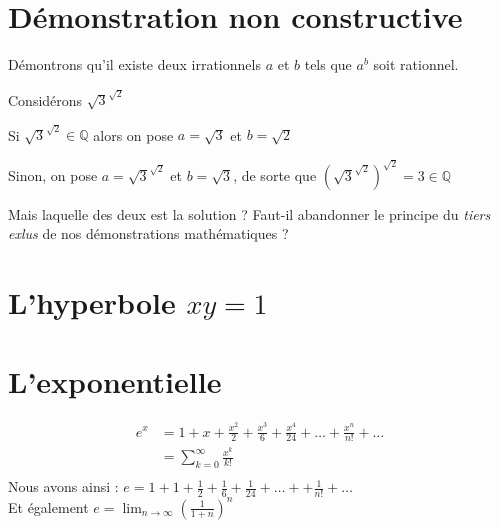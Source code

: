 \documentclass[11pt]{book}
\begin{document}
\section{Démonstration non constructive}
Démontrons qu'il existe deux irrationnels $a$ et $b$ tels que $a^b$ soit rationnel.

Considérons $\sqrt{3}^{\sqrt{2}}$ 

Si  $\sqrt{3}^{\sqrt{2}} \in \mathbb{Q}$ alors on pose $a = \sqrt{3}$ et $b= \sqrt{2}$

Sinon, on pose $a = \sqrt{3}^{\sqrt{2}}$ et $b=\sqrt{3}$, 
de sorte que $ {(\sqrt{3}^{\sqrt{2}})}^{\sqrt{2}} = 3 \in \mathbb{Q} $


Mais laquelle des deux est la solution ?
Faut-il abandonner le principe du \textit{tiers exlus} de nos démonstrations
mathématiques ?
\section{L'hyperbole $xy=1$}

\section{L'exponentielle}
\begin{align*}
e^x &= 1 + x + \frac{x^2}{2} + \frac{x^3}{6} + \frac{x^4}{24} + \dots + \frac{x^n}{n!} + \dots \\
    &= \sum_{k=0}^{\infty} \frac{x^k}{k!} \\
\end{align*}
Nous avons ainsi : $e= 1+1+\frac{1}{2}+\frac{1}{6} +\frac{1}{24}+ \dots + + \frac{1}{n!} + \dots $ \\
Et également $e = \lim_{n \rightarrow \infty} (\frac{1}{1+n})^n $
\end{document}
